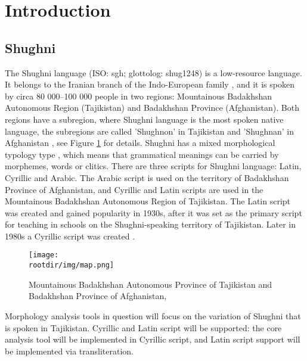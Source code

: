 \section{Introduction}
\subsection{Shughni}
\par The Shughni language (ISO: sgh; glottolog: shug1248) is a low-resource language. It belongs to the Iranian branch of the Indo-European family \parencite[12]{plungian_study_2022}, and it is spoken by circa 80 000--100 000 people \parencite{edelman_dodykhudoeva_shughni_2009} in two regions: Mountainous Badakhshan Autonomous Region (Tajikistan) and Badakhshan Province (Afghanistan). Both regions have a subregion, where Shughni language is the most spoken native language, the subregions are called 'Shughnon' in Tajikistan and 'Shughnan' in Afghanistan \parencite[2]{parker_shughni_2023}, see Figure \ref{fig:map1} for details. Shughni has a mixed morphological typology type \parencite[94]{parker_shughni_2023}, which means that grammatical meanings can be carried by morphemes, words or clitics. There are three scripts for Shughni language: Latin, Cyrillic and Arabic. The Arabic script is used on the territory of Badakhshan Province of Afghanistan, and Cyrillic and Latin scripts are used in the Mountainous Badakhshan Autonomous Region of Tajikistan. The Latin script was created and gained popularity in 1930s, after it was set as the primary script for teaching in schools on the Shughni-speaking territory of Tajikistan. Later in 1980s a Cyrillic script was created \parencite[788]{edelman_dodykhudoeva_shughni_2009}.
\begin{figure}[h]
    \centering
    \texttt{[image: \\rootdir/img/map.png]}
    \caption{Mountainous Badakhshan Autonomous Province of Tajikistan and Badakhshan Province of Afghanistan, \parencite[Fig 1.1]{parker_shughni_2023}}
    \label{fig:map1}
\end{figure}
\par Morphology analysis tools in question will focus on the variation of Shughni that is spoken in Tajikistan. Cyrillic and Latin script will be supported: the core analysis tool will be implemented in Cyrillic script, and Latin script support will be implemented via transliteration.

